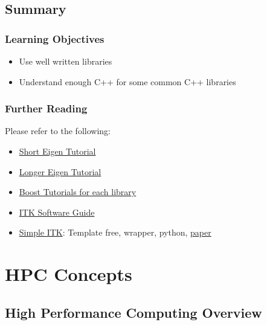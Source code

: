 \subsection{Summary}\label{summary-3}

\subsubsection{Learning Objectives}\label{learning-objectives}

\begin{itemize}
\itemsep1pt\parskip0pt
\item
  Use well written libraries
\item
  Understand enough C++ for some common C++ libraries
\end{itemize}

\subsubsection{Further Reading}\label{further-reading-1}

Please refer to the following:

\begin{itemize}
\itemsep1pt\parskip0pt
\item
  \href{http://eigen.tuxfamily.org/dox/GettingStarted.html}{Short Eigen
  Tutorial}
\item
  \href{http://eigen.tuxfamily.org/dox/group__TutorialMatrixClass.html}{Longer
  Eigen Tutorial}
\item
  \href{http://www.boost.org}{Boost Tutorials for each library}
\item
  \href{http://www.itk.org/ItkSoftwareGuide.pdf}{ITK Software Guide}
\item
  \href{http://www.simpleitk.org}{Simple ITK}: Template free, wrapper,
  python,
  \href{http://www.ncbi.nlm.nih.gov/pmc/articles/PMC3874546/pdf/fninf-07-00045.pdf}{paper}
\end{itemize}

\section{HPC Concepts}\label{hpc-concepts}

\subsection{High Performance Computing
Overview}\label{high-performance-computing-overview}

